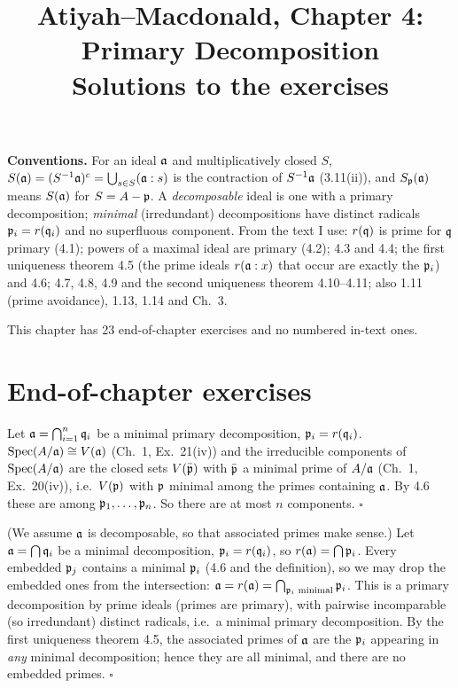 \documentclass[11pt]{article}
\title{Atiyah--Macdonald, Chapter 4: Primary Decomposition\\[2pt]\large Solutions to the exercises}
\author{}
\date{}
\begin{document}
\maketitle
\noindent\textbf{Conventions.} For an ideal $\mathfrak a$ and multiplicatively closed $S$, $S(\mathfrak a)=(S^{-1}\mathfrak a)^c=\bigcup_{s\in S}(\mathfrak a:s)$ is the contraction of $S^{-1}\mathfrak a$ (3.11(ii)), and $S_\mathfrak p(\mathfrak a)$ means $S(\mathfrak a)$ for $S=A-\mathfrak p$. A \emph{decomposable} ideal is one with a primary decomposition; \emph{minimal} (irredundant) decompositions have distinct radicals $\mathfrak p_i=r(\mathfrak q_i)$ and no superfluous component. From the text I use: $r(\mathfrak q)$ is prime for $\mathfrak q$ primary (4.1); powers of a maximal ideal are primary (4.2); 4.3 and 4.4; the first uniqueness theorem 4.5 (the prime ideals $r(\mathfrak a:x)$ that occur are exactly the $\mathfrak p_i$) and 4.6; 4.7, 4.8, 4.9 and the second uniqueness theorem 4.10--4.11; also 1.11 (prime avoidance), 1.13, 1.14 and Ch.~3.

This chapter has 23 end-of-chapter exercises and no numbered in-text ones.

\section*{End-of-chapter exercises}

\pf
Let $\mathfrak a=\bigcap_{i=1}^n\mathfrak q_i$ be a minimal primary decomposition, $\mathfrak p_i=r(\mathfrak q_i)$. $\operatorname{Spec}(A/\mathfrak a)\cong V(\mathfrak a)$ (Ch.~1, Ex.~21(iv)) and the irreducible components of $\operatorname{Spec}(A/\mathfrak a)$ are the closed sets $V(\bar{\mathfrak p})$ with $\bar{\mathfrak p}$ a minimal prime of $A/\mathfrak a$ (Ch.~1, Ex.~20(iv)), i.e.\ $V(\mathfrak p)$ with $\mathfrak p$ minimal among the primes containing $\mathfrak a$. By 4.6 these are among $\mathfrak p_1,\dots,\mathfrak p_n$. So there are at most $n$ components. \hfill$\square$

\pf
(We assume $\mathfrak a$ is decomposable, so that associated primes make sense.) Let $\mathfrak a=\bigcap\mathfrak q_i$ be a minimal decomposition, $\mathfrak p_i=r(\mathfrak q_i)$, so $r(\mathfrak a)=\bigcap\mathfrak p_i$. Every embedded $\mathfrak p_j$ contains a minimal $\mathfrak p_i$ (4.6 and the definition), so we may drop the embedded ones from the intersection: $\mathfrak a=r(\mathfrak a)=\bigcap_{\mathfrak p_i\text{ minimal}}\mathfrak p_i$. This is a primary decomposition by prime ideals (primes are primary), with pairwise incomparable (so irredundant) distinct radicals, i.e.\ a minimal primary decomposition. By the first uniqueness theorem 4.5, the associated primes of $\mathfrak a$ are the $\mathfrak p_i$ appearing in \emph{any} minimal decomposition; hence they are all minimal, and there are no embedded primes. \hfill$\square$
\end{document}

